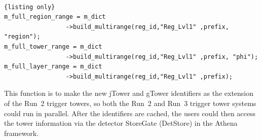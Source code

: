 \\
\begin{lstlisting}{listing only}
m_full_region_range = m_dict
                 ->build_multirange(reg_id,"Reg_Lvl1" ,prefix, "region");
m_full_tower_range = m_dict
                 ->build_multirange(reg_id,"Reg_Lvl1" ,prefix, "phi");
m_full_layer_range = m_dict
                 ->build_multirange(reg_id,"Reg_Lvl1" ,prefix);
\end{lstlisting}
\noindent
This function is to make the new jTower and gTower identifiers as the extension of the Run~2 trigger towers, so both the Run~2 and Run~3 trigger tower systems could run in parallel. After the identifiers are cached, the users could then access the tower information via the detector StoreGate (DetStore)\cite{Calafiura:2003gf} in the Athena framework. 

